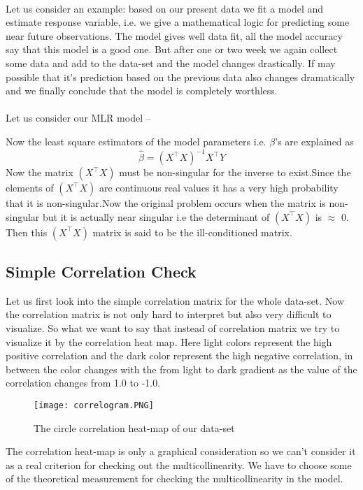 \documentclass[A4paper,11pt]{report}
\begin{document}
	 \paragraph{}Let us consider an example: based on our present data we fit a model and estimate response variable, i.e. we give a mathematical logic for predicting some near future observations. The model gives well data fit, all the model accuracy say that this model is a good one. But after one or two week we again collect some data and add to the data-set and the model changes drastically. If may possible that it’s prediction based on the previous data also changes dramatically and we finally conclude that the model is completely worthless.
	 \paragraph{}Let us consider our MLR model --
	 
	 Now the least square estimators of the model parameters i.e. $\beta$'s are explained as
	 $$\hat{\beta} = (X^\intercal X)^{-1}X^\intercal Y$$
	 Now the matrix $(X^\intercal X)$ must be non-singular for the inverse to exist.Since the elements of $(X^\intercal X)$ are continuous real values it has a very high probability that it is non-singular.Now the original problem occurs when the matrix is non-singular but it is actually near singular i.e the determinant of $(X^\intercal X)$ is $\approx$ 0. Then this $(X^\intercal X)$ matrix is said to be the ill-conditioned matrix.
	 \subsection{Simple Correlation Check}Let us first look into the simple correlation matrix for the whole data-set. Now the correlation matrix is not only hard to interpret but also very difficult to visualize. So what we want to say that instead of correlation matrix we try to visualize it by the correlation heat map. Here light colors represent the high positive correlation and the dark color represent the high negative correlation, in between the color changes with the from light to dark gradient as the value of the correlation changes from 1.0 to -1.0.
	 \begin{figure}[H]
	 	\texttt{[image: correlogram.PNG]}
	 	\caption {The circle correlation heat-map of our data-set}
	 \end{figure}
	 The correlation heat-map is only a graphical consideration so we can't consider it as a real criterion for checking out the multicollinearity. We have to choose some of the theoretical measurement for checking the multicollinearity in the model.
\end{document}
